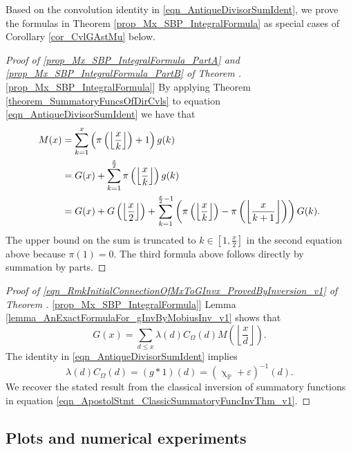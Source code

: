 \documentclass[11pt,reqno,a4letter]{article}
\newcommand{\hlocalref}[1]{\hyperref[#1]{\ref{#1}}}
\numberwithin{equation}{section}
\numberwithin{figure}{section}
\numberwithin{table}{section}
\renewcommand{\chi}{\upchi}
\newcommand{\Floor}[2]{\ensuremath{\left\lfloor \frac{#1}{#2} \right\rfloor}}
\theoremstyle{plain}
\numberwithin{theorem}{section}
\theoremstyle{definition}
\begin{document}
Based on the convolution identity in \eqref{eqn_AntiqueDivisorSumIdent}, 
we prove the formulas in 
Theorem \hlocalref{prop_Mx_SBP_IntegralFormula} as special cases of 
Corollary \hlocalref{cor_CvlGAstMu} below. 
 
\begin{proof}[Proof of 
              \eqref{prop_Mx_SBP_IntegralFormula_PartA} and \eqref{prop_Mx_SBP_IntegralFormula_PartB} of 
              Theorem \hlocalref{prop_Mx_SBP_IntegralFormula}] 
By applying Theorem \hlocalref{theorem_SummatoryFuncsOfDirCvls} to 
equation \eqref{eqn_AntiqueDivisorSumIdent} we have that 
\begin{align} 
\notag
M(x) & = \sum_{k=1}^{x} \left(\pi\left(\Floor{x}{k}\right)+1\right) g(k) \\ 
\notag 
     & = G(x) + \sum_{k=1}^{\frac{x}{2}} \pi\left(\Floor{x}{k}\right) g(k) \\ 
\notag 
     & = G(x) + G\left(\Floor{x}{2}\right) + 
     \sum_{k=1}^{\frac{x}{2}-1} \left( 
     \pi\left(\Floor{x}{k}\right) - \pi\left(\Floor{x}{k+1}\right) 
	\right) G(k).
\end{align} 
The upper bound on the sum is truncated to $k \in \left[1, \frac{x}{2}\right]$ in the second equation 
above because $\pi(1) = 0$. 
The third formula above follows directly by summation by parts. 
\end{proof} 
\begin{proof}[Proof of \eqref{eqn_RmkInitialConnectionOfMxToGInvx_ProvedByInversion_v1} of 
	      Theorem \hlocalref{prop_Mx_SBP_IntegralFormula}]
Lemma \hlocalref{lemma_AnExactFormulaFor_gInvByMobiusInv_v1} shows that 
\[
G(x) = \sum_{d \leq x} \lambda(d) C_{\Omega}(d) M\left(\Floor{x}{d}\right). 
\]
The identity in \eqref{eqn_AntiqueDivisorSumIdent} implies 
$$\lambda(d) C_{\Omega}(d) = (g \ast 1)(d) = (\chi_{\mathbb{P}} + \varepsilon)^{-1}(d).$$ 
We recover the stated result from the classical inversion of summatory functions in 
equation \eqref{eqn_ApostolStmt_ClassicSummatoryFuncInvThm_v1}. 
\end{proof}

\subsection{Plots and numerical experiments}
\end{document}
